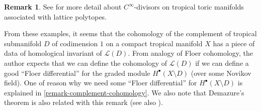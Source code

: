 \documentclass[a4paper,dvipdfmx,reqno,12pt]{amsart}
\theoremstyle{definition}
\newtheorem{remark}[theorem]{Remark}
\numberwithin{equation}{section}
\begin{document}
\begin{remark}
See \cite[Appendix D]{tsutsui2023graded}
for more detail about $C^{\infty}$-divisors on
tropical toric manifolds associated with lattice polytopes.

From these examples, it seems that the cohomology
of the complement of tropical submanifold $D$ of codimension
$1$ on a compact tropical manifold $X$ has a piece of data of
homological invariant of $\mathcal{L}(D)$.
From analogy of Floer cohomology,
the author expects that we can define the cohomology
of $\mathcal{L}(D)$ if we can define a good 
``Floer differential'' for the graded module
$H^{\bullet}(X\setminus D)$ (over some Novikov field).
One of reason why we need some ``Floer differential'' for
$H^{\bullet}(X\setminus D)$ is explained
in \cref{remark-complement-cohomology}.
We also note that 
Demazure's theorem \cite{MR284446} is also related
with this remark 
(see also \cite[]{MR2810322}).
\end{remark}
\end{document}
